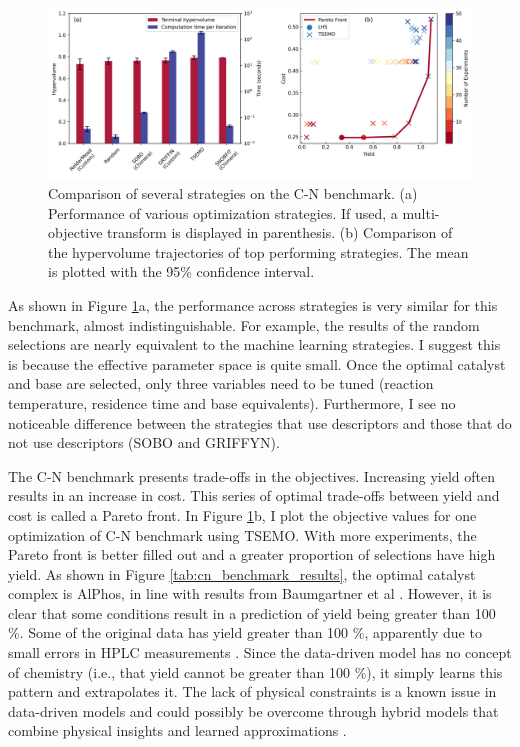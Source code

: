 \begin{figure}
    \centering
    \includegraphics[width=1.2\textwidth]{gfx/Chapter03/cn_hv_time_tradeoff.png}
    \caption{Comparison of several strategies on the C-N benchmark. (a) Performance of various optimization strategies. If used, a multi-objective transform is displayed in parenthesis. (b) Comparison of the hypervolume trajectories of top performing strategies. The mean is plotted with the 95\% confidence interval.}
    \label{fig:cn_hv_time}
\end{figure}

As shown in Figure \ref{fig:cn_hv_time}a, the performance across strategies is very similar for this benchmark, almost indistinguishable. For example, the results of the random selections are nearly equivalent to the machine learning strategies. I suggest this is because the effective parameter space is quite small. Once the optimal catalyst and base are selected, only three variables need to be tuned (reaction temperature, residence time and base equivalents). Furthermore, I see no noticeable difference between the strategies that use descriptors and those that do not use descriptors (SOBO and GRIFFYN).

The C-N benchmark presents trade-offs in the objectives. Increasing yield often results in an increase in cost. This series of optimal trade-offs between yield and cost is called a Pareto front. In Figure \ref{fig:cn_hv_time}b, I plot the objective values for one optimization of C-N benchmark using TSEMO. With more experiments, the Pareto front is better filled out and a greater proportion of selections have high yield. As shown in Figure \ref{tab:cn_benchmark_results}, the optimal catalyst complex is AlPhos, in line with results from Baumgartner et al \cite{Baumgartner2019}. However, it is clear that some conditions result in a prediction of yield being greater than 100 \%. Some of the original data has yield greater than 100 \%, apparently due to small errors in HPLC measurements \cite{Baumgartner2019}. Since the data-driven model has no concept of chemistry (i.e., that yield cannot be greater than 100 \%), it simply learns this pattern and extrapolates it. The lack of physical constraints is a known issue in data-driven models and could possibly be overcome through hybrid models that combine physical insights and learned approximations \cite{Thompson1994, Tsay2019}.


